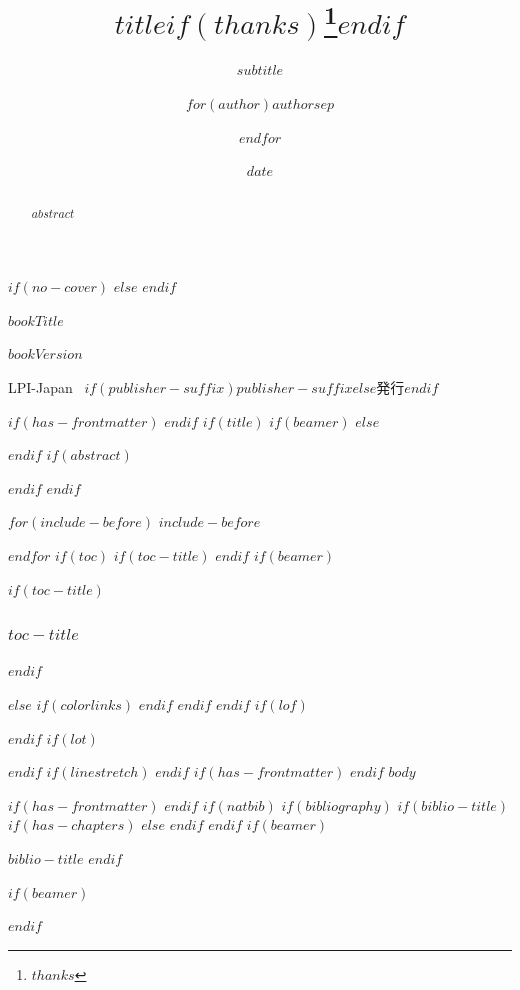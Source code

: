 \documentclass[
$if(fontsize)$
  $fontsize$,
$endif$
$if(papersize)$
  $papersize$paper,
$endif$
$if(beamer)$
  ignorenonframetext,
$if(handout)$
  handout,
$endif$
$if(aspectratio)$
  aspectratio=$aspectratio$,
$endif$
$endif$
$for(classoption)$
  $classoption$$sep$,
$endfor$
]{$documentclass$}
\title{$title$$if(thanks)$\thanks{$thanks$}$endif$}
\subtitle{$subtitle$}
\author{$for(author)$$author$$sep$ \and $endfor$}
\date{$date$}
\institute{$for(institute)$$institute$$sep$ \and $endfor$}
\newif\ifbibliography
\begin{document}
$if(no-cover)$
$else$
\thispagestyle{empty}
\null
\cleardoublepage
$endif$

\thispagestyle{empty}
\begin{center}
  \vspace*{6cm}
  {\Huge\linespread{1.2}\selectfont $bookTitle$\par}

  \vfill

  {\Large $bookVersion$}

  {\Large LPI-Japan \, $if(publisher-suffix)$$publisher-suffix$$else$発行$endif$}

  \vspace*{4cm}
\end{center}
\newpage

$if(has-frontmatter)$
\frontmatter
$endif$
$if(title)$
$if(beamer)$
\frame{\titlepage}
$else$
\maketitle
$endif$
$if(abstract)$
\begin{abstract}
$abstract$
\end{abstract}
$endif$
$endif$


$for(include-before)$
$include-before$

$endfor$
\newpage
$if(toc)$
$if(toc-title)$
\renewcommand*\contentsname{$toc-title$}
$endif$
$if(beamer)$
\begin{frame}[allowframebreaks]
$if(toc-title)$
  \frametitle{$toc-title$}
$endif$
  \tableofcontents[hideallsubsections]
\end{frame}
$else$
{
$if(colorlinks)$
\hypersetup{linkcolor=$if(toccolor)$$toccolor$$else$$endif$}
$endif$
\setcounter{tocdepth}{$toc-depth$}
\tableofcontents
\newpage
}
$endif$
$endif$
$if(lof)$
\listoffigures
$endif$
$if(lot)$
\listoftables
$endif$
$if(linestretch)$
$endif$
$if(has-frontmatter)$
\mainmatter
$endif$
$body$

$if(has-frontmatter)$
\backmatter
$endif$
$if(natbib)$
$if(bibliography)$
$if(biblio-title)$
$if(has-chapters)$
\renewcommand\bibname{$biblio-title$}
$else$
\renewcommand\refname{$biblio-title$}
$endif$
$endif$
$if(beamer)$
\begin{frame}[allowframebreaks]{$biblio-title$}
  \bibliographytrue
$endif$
  
$if(beamer)$
\end{frame}
$endif$
\end{document}
